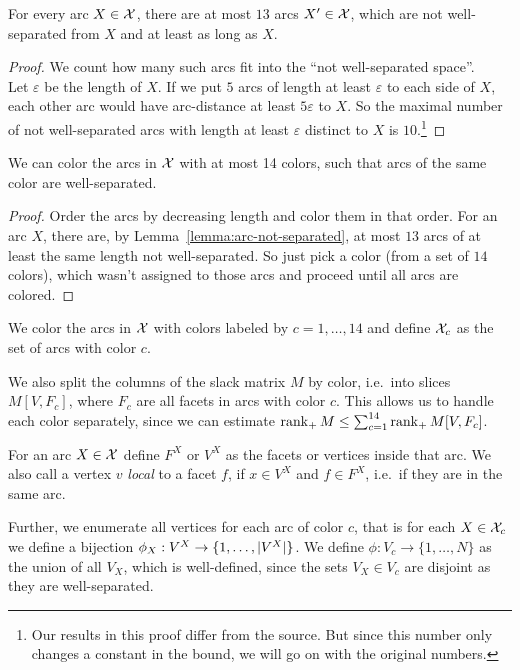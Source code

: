 \begin{lemma}\label{lemma:arc-not-separated}
  For every arc $X \in \mathcal{X}$, there are at most $13$ arcs $X' \in \mathcal{X}$, which are not well-separated from $X$ and at least as long as $X$.
\end{lemma}

\begin{proof}
  We count how many such arcs fit into the ``not well-separated space''.\\
  Let $\varepsilon$ be the length of $X$. If we put $5$ arcs of length at least $\varepsilon$ to each side of $X$, each other arc would have arc-distance at least $5\varepsilon$ to $X$. So the maximal number of not well-separated arcs with length at least $\varepsilon$ distinct to $X$ is $10$.\footnote{Our results in this proof differ from the source. But since this number only changes a constant in the bound, we will go on with the original numbers.}
\end{proof}

\begin{lemma}
  We can color the arcs in $\mathcal{X}$ with at most 14 colors, such that arcs of the same color are well-separated.
\end{lemma}

\begin{proof}
  Order the arcs by decreasing length and color them in that order. For an arc $X$, there are, by Lemma~\ref{lemma:arc-not-separated}, at most $13$ arcs of at least the same length not well-separated. So just pick a color (from a set of $14$ colors), which wasn't assigned to those arcs and proceed until all arcs are colored.
\end{proof}

We color the arcs in $\mathcal{X}$ with colors labeled by $c=1,\dots,14$ and define $\mathcal{X}_c$ as the set of arcs with color $c$.

We also split the columns of the slack matrix $M$ by color, i.e.\ into slices $M[V,F_c]$, where $F_c$ are all facets in arcs with color $c$.
This allows us to handle each color separately, since we can estimate $\operatorname{rank}_+ M \leq \sum_{c=1}^{14} \operatorname{rank}_+ M[V,F_c]$.

For an arc $X \in \mathcal{X}$ define $F^X$ or $V^X$ as the facets or vertices inside that arc. We also call a vertex $v$ \emph{local} to a facet $f$, if $x \in V^X$ and $f \in F^X$, i.e.\ if they are in the same arc.

Further, we enumerate all vertices for each arc of color $c$, that is for each $X \in \mathcal{X}_c$ we define a bijection $\phi_X: V^X \to \{1,\dots,\lvert V^X\rvert\}$. We define $\phi: V_c \to \{1,\dots,N\}$ as the union of all $V_X$, which is well-defined, since the sets $V_X \in V_c$ are disjoint as they are well-separated.


